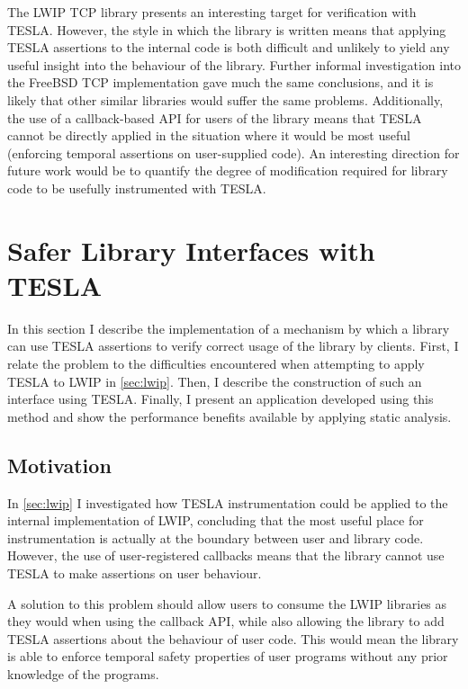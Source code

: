 The LWIP TCP library presents an interesting target for verification with TESLA.
However, the style in which the library is written means that applying TESLA
assertions to the internal code is both difficult and unlikely to yield any
useful insight into the behaviour of the library. Further informal investigation
into the FreeBSD TCP implementation gave much the same conclusions, and it is
likely that other similar libraries would suffer the same problems.
Additionally, the use of a callback-based API for users of the library means
that TESLA cannot be directly applied in the situation where it would be most
useful (enforcing temporal assertions on user-supplied code). An interesting
direction for future work would be to quantify the degree of modification
required for library code to be usefully instrumented with TESLA.

\section{Safer Library Interfaces with TESLA} \label{sec:safer-libs}

In this section I describe the implementation of a mechanism by which a
library can use TESLA assertions to verify correct usage of the library
by clients. First, I relate the problem to the difficulties encountered
when attempting to apply TESLA to LWIP in \autoref{sec:lwip}. Then, I
describe the construction of such an interface using TESLA. Finally, I
present an application developed using this method and show the
performance benefits available by applying static analysis.

\subsection{Motivation}

In \autoref{sec:lwip} I investigated how TESLA instrumentation could be applied
to the internal implementation of LWIP, concluding that the most useful place
for instrumentation is actually at the boundary between user and library code.
However, the use of user-registered callbacks means that the library cannot use
TESLA to make assertions on user behaviour.

A solution to this problem should allow users to consume the LWIP libraries as
they would when using the callback API, while also allowing the library to add
TESLA assertions about the behaviour of user code. This would mean the library
is able to enforce temporal safety properties of user programs without any prior
knowledge of the programs.

